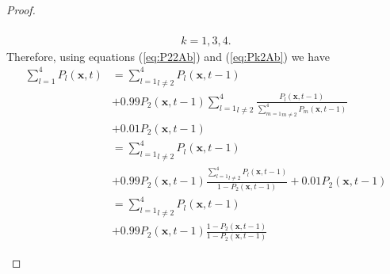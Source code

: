 \documentclass[\main/thesis.tex]{subfiles}
\begin{document}
\begin{proof}
\begin{itemize}
\begin{itemize}
\begin{itemize}
\begin{align*}
                                                      \label{eq:Pk2Ab} \\
                                                      k {=} 1, 3, 4.
                                                    \end{align*}
                                                    Therefore, using equations (\ref{eq:P22Ab}) and (\ref{eq:Pk2Ab}) we have 
                                                    \begin{align*}
                                                      \sum_{l{=}1}^4 P_l(\boldsymbol{x}, t) 
                                                      &{=} \underset{l {\ne} 2}{\sum_{l{=}1}^4}  
                                                             P_l(\boldsymbol{x}, t{-}1) \\
                                                      &{+} 0.99 P_2(\boldsymbol{x}, t{-}1)
                                                           \underset{l {\ne} 2}{\sum_{l{=}1}^4}
                                                           \frac{P_l(\boldsymbol{x}, t{-}1)}
                                                                {\underset{m {\ne} 2}{\sum_{m{=}1}^4} 
                               	                                 P_m(\boldsymbol{x}, t{-}1)}\\
                                                      &{+} 0.01 P_2(\boldsymbol{x}, t{-}1) \\
                                                      &{=} \underset{l {\ne} 2}{\sum_{l{=}1}^4} P_l(\boldsymbol{x}, t{-}1)\\
                                                      &{+} 0.99 P_2(\boldsymbol{x}, t{-}1)
                                                           \frac{\underset{l {\ne} 2}{\sum_{l{=}1}^4}
                                                                 P_l(\boldsymbol{x}, t{-}1)}
                                                                {1 {-} P_2(\boldsymbol{x}, t{-}1)}
                                                       {+} 0.01 P_2(\boldsymbol{x}, t{-}1) \\
                                                      &{=} \underset{l {\ne} 2}{\sum_{l{=}1}^4} P_l(\boldsymbol{x}, t{-}1)\\
                                                      &{+} 0.99 P_2(\boldsymbol{x}, t{-}1)
                                                          \frac{1 {-} P_2(\boldsymbol{x}, t{-}1)}
                                                               {1 {-} P_2(\boldsymbol{x}, t{-}1)}

\end{align*}
\end{itemize}
\end{itemize}
\end{itemize}
\end{proof}
\end{document}
